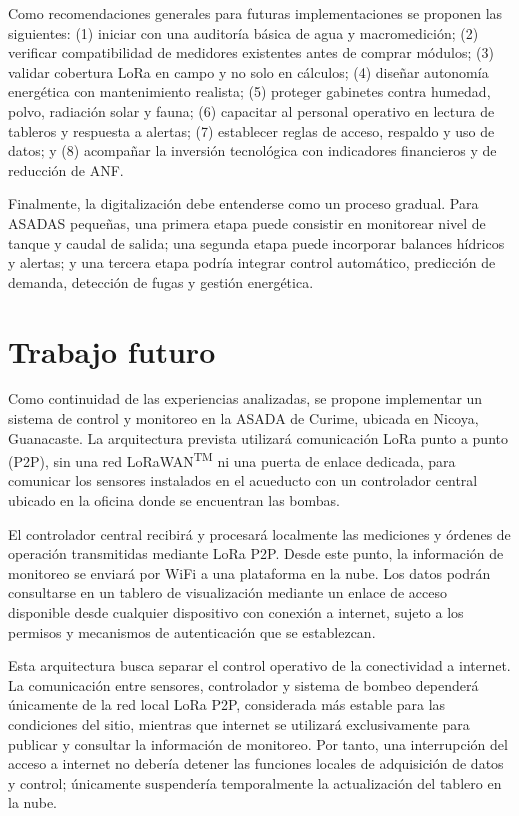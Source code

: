 \documentclass[12pt,letterpaper]{article}
\begin{document}
Como recomendaciones generales para futuras implementaciones se proponen las siguientes: (1) iniciar con una auditoría básica de agua y macromedición; (2) verificar compatibilidad de medidores existentes antes de comprar módulos; (3) validar cobertura LoRa en campo y no solo en cálculos; (4) diseñar autonomía energética con mantenimiento realista; (5) proteger gabinetes contra humedad, polvo, radiación solar y fauna; (6) capacitar al personal operativo en lectura de tableros y respuesta a alertas; (7) establecer reglas de acceso, respaldo y uso de datos; y (8) acompañar la inversión tecnológica con indicadores financieros y de reducción de ANF.

Finalmente, la digitalización debe entenderse como un proceso gradual. Para ASADAS pequeñas, una primera etapa puede consistir en monitorear nivel de tanque y caudal de salida; una segunda etapa puede incorporar balances hídricos y alertas; y una tercera etapa podría integrar control automático, predicción de demanda, detección de fugas y gestión energética.

\section{Trabajo futuro}
Como continuidad de las experiencias analizadas, se propone implementar un sistema de control y monitoreo en la ASADA de Curime, ubicada en Nicoya, Guanacaste. La arquitectura prevista utilizará comunicación LoRa punto a punto (P2P), sin una red LoRaWAN\textsuperscript{TM} ni una puerta de enlace dedicada, para comunicar los sensores instalados en el acueducto con un controlador central ubicado en la oficina donde se encuentran las bombas.

El controlador central recibirá y procesará localmente las mediciones y órdenes de operación transmitidas mediante LoRa P2P. Desde este punto, la información de monitoreo se enviará por WiFi a una plataforma en la nube. Los datos podrán consultarse en un tablero de visualización mediante un enlace de acceso disponible desde cualquier dispositivo con conexión a internet, sujeto a los permisos y mecanismos de autenticación que se establezcan.

Esta arquitectura busca separar el control operativo de la conectividad a internet. La comunicación entre sensores, controlador y sistema de bombeo dependerá únicamente de la red local LoRa P2P, considerada más estable para las condiciones del sitio, mientras que internet se utilizará exclusivamente para publicar y consultar la información de monitoreo. Por tanto, una interrupción del acceso a internet no debería detener las funciones locales de adquisición de datos y control; únicamente suspendería temporalmente la actualización del tablero en la nube.
\end{document}
